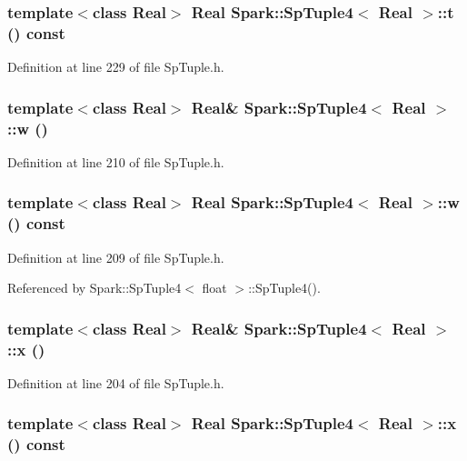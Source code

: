 \subsubsection{\setlength{\rightskip}{0pt plus 5cm}template$<$class Real$>$ Real {\bf Spark::Sp\-Tuple4}$<$ Real $>$::t () const\hspace{0.3cm}{\tt  [inline]}}\label{classSpark_1_1SpTuple4_a20}


Definition at line 229 of file Sp\-Tuple.h.
\subsubsection{\setlength{\rightskip}{0pt plus 5cm}template$<$class Real$>$ Real\& {\bf Spark::Sp\-Tuple4}$<$ Real $>$::w ()\hspace{0.3cm}{\tt  [inline]}}\label{classSpark_1_1SpTuple4_a9}


Definition at line 210 of file Sp\-Tuple.h.
\subsubsection{\setlength{\rightskip}{0pt plus 5cm}template$<$class Real$>$ Real {\bf Spark::Sp\-Tuple4}$<$ Real $>$::w () const\hspace{0.3cm}{\tt  [inline]}}\label{classSpark_1_1SpTuple4_a8}


Definition at line 209 of file Sp\-Tuple.h.

Referenced by Spark::Sp\-Tuple4$<$ float $>$::Sp\-Tuple4().
\subsubsection{\setlength{\rightskip}{0pt plus 5cm}template$<$class Real$>$ Real\& {\bf Spark::Sp\-Tuple4}$<$ Real $>$::x ()\hspace{0.3cm}{\tt  [inline]}}\label{classSpark_1_1SpTuple4_a3}


Definition at line 204 of file Sp\-Tuple.h.
\subsubsection{\setlength{\rightskip}{0pt plus 5cm}template$<$class Real$>$ Real {\bf Spark::Sp\-Tuple4}$<$ Real $>$::x () const\hspace{0.3cm}{\tt  [inline]}}\label{classSpark_1_1SpTuple4_a2}


